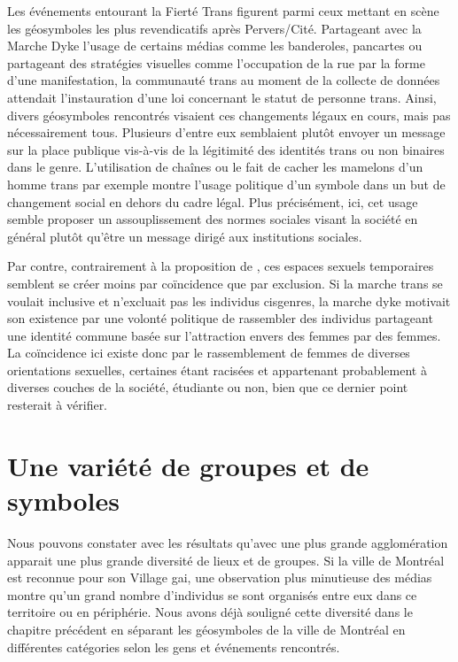 Les événements entourant la Fierté Trans figurent parmi ceux mettant en scène les géosymboles les plus revendicatifs après Pervers/Cité.
Partageant avec la Marche Dyke l'usage de certains médias comme les banderoles, pancartes ou partageant des stratégies visuelles comme l'occupation de la rue par la forme d'une manifestation, la communauté trans au moment de la collecte de données attendait l'instauration d'une loi concernant le statut de personne trans.
Ainsi, divers géosymboles rencontrés visaient ces changements légaux en cours, mais pas nécessairement tous.
Plusieurs d'entre eux semblaient plutôt envoyer un message sur la place publique vis-à-vis de la légitimité des identités trans ou non binaires dans le genre.
L'utilisation de chaînes ou le fait de cacher les mamelons d'un homme trans par exemple montre l'usage politique d'un symbole dans un but de changement social en dehors du cadre légal. Plus précisément, ici, cet usage semble proposer un assouplissement des normes sociales visant la société en général plutôt qu'être un message dirigé aux institutions sociales.

Par contre, contrairement à la proposition de \citet{Probyn1996}, ces espaces sexuels temporaires semblent se créer moins par coïncidence que par exclusion.
Si la marche trans se voulait inclusive et n'excluait pas les individus cisgenres, la marche dyke motivait son existence par une volonté politique de rassembler des individus partageant une identité commune basée sur l'attraction envers des femmes par des femmes.
La coïncidence ici existe donc par le rassemblement de femmes de diverses orientations sexuelles, certaines étant racisées et appartenant probablement à diverses couches de la société, étudiante ou non, bien que ce dernier point resterait à vérifier.

\section{Une variété de groupes et de symboles}
\label{sec:une_variete_de_groupes_et_de_symboles}

Nous pouvons constater avec les résultats qu'avec une plus grande agglomération apparait une plus grande diversité de lieux et de groupes.
Si la ville de Montréal est reconnue pour son Village gai, une observation plus minutieuse des médias \lgbt{} montre qu'un grand nombre d'individus se sont organisés entre eux dans ce territoire ou en périphérie.
Nous avons déjà souligné cette diversité dans le chapitre précédent en séparant les géosymboles de la ville de Montréal en différentes catégories selon les gens et événements rencontrés.

